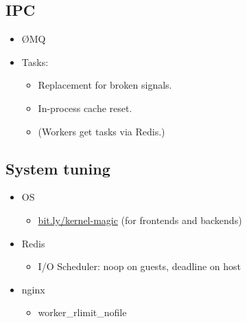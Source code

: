 \documentclass[aspectratio=169,handout,bigger]{beamer}
\begin{document}

\subsection*{IPC}

\begin{frame}
  \begin{itemize}
    \item ØMQ
    \item Tasks:
    \begin{itemize}
      \item Replacement for broken signals.
      \item In-process cache reset.
      \item (Workers get tasks via Redis.)
    \end{itemize}
  \end{itemize}
\end{frame}


\subsection*{System tuning}

\begin{frame}
  \begin{itemize}
    \item OS
    \begin{itemize}
      \item \href{http://bit.ly/kernel-magic}{bit.ly/kernel-magic} (for frontends and backends)
    \end{itemize}
    \item Redis
    \begin{itemize}
      \item I/O Scheduler: noop on guests, deadline on host
    \end{itemize}
    \item nginx
    \begin{itemize}
      \item worker\_rlimit\_nofile
    \end{itemize}
  \end{itemize}
\end{frame}

\end{document}
